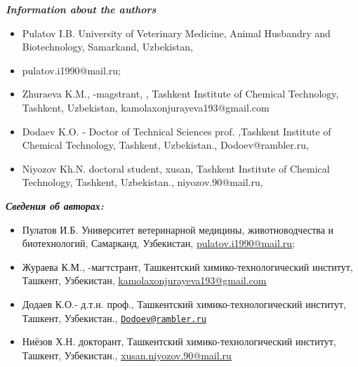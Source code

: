 \emph{{\bfseries Information about the authors}}

\begin{itemize}
\item
Pulatov I.B. University of Veterinary Medicine, Animal Husbandry and
Biotechnology, Samarkand, Uzbekistan,

\item
pulatov.i1990@mail.ru;

\item
Zhuraeva K.M., -magstrant, , Tashkent Institute of Chemical Technology,
Tashkent, Uzbekistan, kamolaxonjurayeva193@gmail.com

\item
Dodaev K.O. - Doctor of Technical Sciences prof. ,Tashkent Institute of
Chemical Technology, Tashkent, Uzbekistan., Dodoev@rambler.ru,

\item
Niyozov Kh.N. doctoral student, xusan, Tashkent Institute of Chemical
Technology, Tashkent, Uzbekistan., niyozov.90@mail.ru,
\end{itemize}

\emph{{\bfseries Сведения об авторах:}}

\begin{itemize}
\item
Пулатов И.Б. Университет ветеринарной медицины, животноводчества и
биотехнологий, Самарканд, Узбекистан,
\href{mailto:pulatov.i1990@mail.ru}{\ul{pulatov.i1990@mail.ru}};

\item
Жураева К.М., -магтстрант, Ташкентский химико-технологический институт,
Ташкент, Узбекистан,
\href{mailto:kamolaxonjurayeva193@gmail.com}{\ul{kamolaxonjurayeva193@gmail.com}}

\item
Додаев К.О.- д.т.н. проф., Ташкентский химико-технологический институт,
Ташкент, Узбекистан.,
\href{mailto:Dodoev@rambler.ru}{\nolinkurl{Dodoev@rambler.ru}}

\item
Ниёзов Х.Н. докторант, Ташкентский химико-технологический институт,
Ташкент, Узбекистан.,
\href{mailto:xusan.niyozov.90@mail.ru}{\ul{xusan.niyozov.90@mail.ru}}
\end{itemize}
